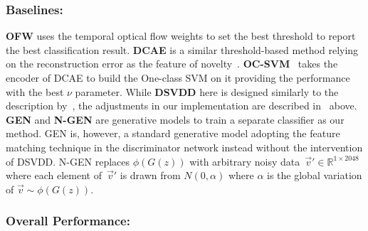 \documentclass[letterpaper]{article} %
\begin{document}
\subsubsection{Baselines:}
\label{sec:baselines}

\textbf{OFW} uses the temporal optical flow weights to set the best
threshold to report the best classification result. \textbf{DCAE} is a
similar threshold-based method relying on the reconstruction error as
the feature of novelty~\citep{KWWBKA19}. \textbf{OC-SVM}~\citep{SPSSW01}
takes the encoder of DCAE to build the One-class SVM on it providing the
performance with the best $\nu$ parameter. While \textbf{DSVDD} here is
designed similarly to the description by~\citet{RVGDSBMK18}, the
adjustments in our implementation are described
in~ above. \textbf{GEN} and
\textbf{\mbox{N-GEN}}
are generative models to train a separate classifier as our method. GEN
is, however, a standard generative model adopting the feature matching
technique in the discriminator network instead without the intervention
of DSVDD. \mbox{N-GEN} replaces $\phi(G(z))$ with arbitrary noisy
data~$\vec{v}'\in\mathbb{R}^{1\times2048}$ where each element
of~$\vec{v}'$ is drawn from $\mathit{N}(0, \alpha)$ where $\alpha$ is
the global variation of $\vec{v}\sim\phi(G(z))$.

\subsubsection{Overall Performance:}
\label{sec:overall_performance}
\end{document}
